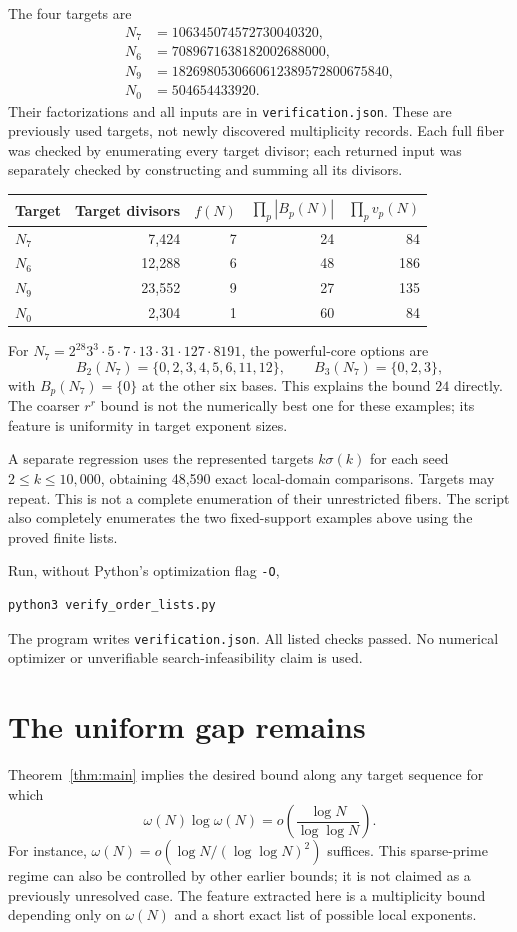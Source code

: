 \documentclass[11pt]{article}
\begin{document}
The four targets are
\begin{align*}
 N_7&=106345074572730040320,\\
 N_6&=7089671638182002688000,\\
 N_9&=1826980530660612389572800675840,\\
 N_0&=504654433920.
\end{align*}
Their factorizations and all inputs are in \texttt{verification.json}. These are previously used targets, not newly discovered multiplicity records. Each full fiber was checked by enumerating every target divisor; each returned input was separately checked by constructing and summing all its divisors.

\begin{center}
\begin{tabular}{@{}lrrrr@{}}
\toprule
Target & Target divisors & $f(N)$ & $\prod_p|B_p(N)|$ & $\prod_p v_p(N)$\\
\midrule
$N_7$ & 7,424 & 7 & 24 & 84\\
$N_6$ & 12,288 & 6 & 48 & 186\\
$N_9$ & 23,552 & 9 & 27 & 135\\
$N_0$ & 2,304 & 1 & 60 & 84\\
\bottomrule
\end{tabular}
\end{center}

For $N_7=2^{28}3^3\cdot5\cdot7\cdot13\cdot31\cdot127\cdot8191$, the powerful-core options are
\[
 B_2(N_7)=\{0,2,3,4,5,6,11,12\},\qquad
 B_3(N_7)=\{0,2,3\},
\]
with $B_p(N_7)=\{0\}$ at the other six bases. This explains the bound $24$ directly. The coarser $r^r$ bound is not the numerically best one for these examples; its feature is uniformity in target exponent sizes.

A separate regression uses the represented targets $k\sigma(k)$ for each seed $2\le k\le10,000$, obtaining 48,590 exact local-domain comparisons. Targets may repeat. This is not a complete enumeration of their unrestricted fibers. The script also completely enumerates the two fixed-support examples above using the proved finite lists.

Run, without Python's optimization flag \texttt{-O},
\begin{verbatim}
python3 verify_order_lists.py
\end{verbatim}
The program writes \texttt{verification.json}. All listed checks passed. No numerical optimizer or unverifiable search-infeasibility claim is used.

\section{The uniform gap remains}
Theorem~\ref{thm:main} implies the desired bound along any target sequence for which
\[
 \omega(N)\log\omega(N)=o\!\left(\frac{\log N}{\log\log N}\right).
\]
For instance, $\omega(N)=o(\log N/(\log\log N)^2)$ suffices. This sparse-prime regime can also be controlled by other earlier bounds; it is not claimed as a previously unresolved case. The feature extracted here is a multiplicity bound depending only on $\omega(N)$ and a short exact list of possible local exponents.
\end{document}
